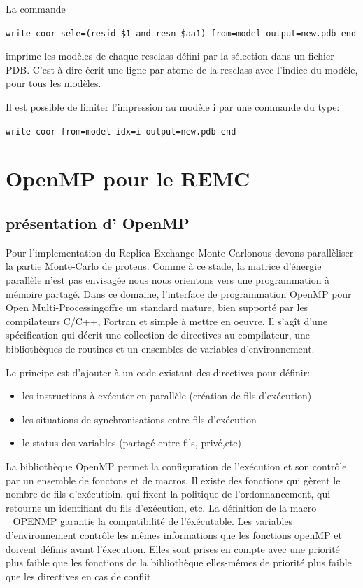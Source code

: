 La commande 

\verb!write coor sele=(resid $1 and resn $aa1) from=model output=new.pdb end!

imprime les modèles de chaque resclass défini par la sélection dans un fichier PDB. C'est-à-dire écrit une ligne par atome de la resclass avec l'indice du modèle, pour tous les modèles. 

Il est possible de limiter l'impression au modèle i par une commande du type:

\verb!write coor from=model idx=i output=new.pdb end!


\section{OpenMP pour le REMC}
\subsection{présentation d' OpenMP}

Pour l'implementation du \og Replica Exchange Monte Carlo\fg nous devons parallèliser la partie Monte-Carlo de proteus. Comme à ce stade, la matrice d'énergie parallèle n'est pas envisagée nous nous orientons vers une programmation à mémoire partagé. Dans ce domaine, l'interface de programmation OpenMP pour \og Open Multi-Processing\fg  offre un standard mature, bien supporté par les compilateurs C/C++, Fortran et simple à mettre en oeuvre. Il s'agît d'une spécification qui décrit une collection de directives au compilateur, une bibliothèques de routines et un ensembles de variables d'environnement. 


Le principe est d'ajouter à un code existant des directives pour définir:

\begin{itemize}
\item les instructions à exécuter en parallèle (création de fils d'exécution)
\item les situations de synchronisations entre fils d'exécution
\item le status des variables (partagé entre fils, privé,etc) 
\end{itemize}

La bibliothèque OpenMP permet la configuration de l'exécution et son contrôle par un ensemble de fonctons et de macros. Il existe des fonctions qui gèrent le nombre de fils d'exécutioin, qui fixent la politique de l'ordonnancement, qui retourne un identifiant du fils d'exécution, etc. La définition de la macro \_OPENMP garantie la compatibilité de l'éxécutable.
Les variables d'environnement contrôle les mêmes informations que les fonctions openMP et doivent définis avant l'éxecution. Elles sont prises en compte avec une priorité plus faible que les fonctions de la bibliothèque elles-mêmes de priorité plus faible que les directives en cas de conflit.

